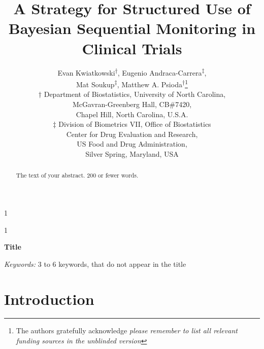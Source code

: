 \documentclass[12pt]{article}
\newcommand{\blind}{1}
\begin{document}
%

\def\spacingset#1{\renewcommand{\baselinestretch}%
{#1}\small\normalsize} \spacingset{1}



\blind
{
  \title{\bf A Strategy for Structured Use of Bayesian Sequential Monitoring in Clinical Trials}
  \author{Evan Kwiatkowski\textsuperscript{$\dagger$}, 
	        Eugenio Andraca-Carrera\textsuperscript{$\ddagger$},\\
					Mat Soukup\textsuperscript{$\ddagger$},
					\medskip Matthew A. Psioda\textsuperscript{$\dagger$}\thanks{The authors gratefully acknowledge \textit{please remember to list all relevant funding sources in the unblinded version}}\\
	  $\dagger$ Department of Biostatistics,
		University of North Carolina, \\
		McGavran-Greenberg Hall, CB\#7420, \\
		\medskip Chapel Hill, North Carolina, U.S.A.\\
    $\ddagger$ Division of Biometrics VII, Office of Biostatistics \\
		           Center for Drug Evaluation and Research, \\
							 US Food and Drug Administration, \\
							 Silver Spring, Maryland, USA \\									
		}
  \maketitle
} \fi

\blind
{
  \bigskip
  \bigskip
  \bigskip
  \begin{center}
    {\LARGE\bf Title}
\end{center}
  \medskip
} \fi

\bigskip
\begin{abstract}
The text of your abstract. 200 or fewer words.
\end{abstract}

\noindent%
{\it Keywords:}  3 to 6 keywords, that do not appear in the title
\vfill

\newpage
\spacingset{1.5} %

\section{Introduction}
\end{document}
